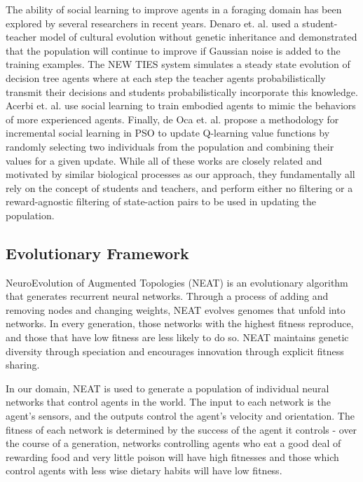 \documentclass{acm_proc_article-sp}
\begin{document}
The ability of social learning to improve agents in a foraging domain has been explored by several researchers in recent years. Denaro et. al. \cite{denaro1996cultural} used a student-teacher model of cultural evolution without genetic inheritance and demonstrated that the population will continue to improve if Gaussian noise is added to the training examples. The NEW TIES system \cite{haasdijk2008social, vogt2010modeling} simulates a steady state evolution of decision tree agents where at each step the teacher agents probabilistically transmit their decisions and students probabilistically incorporate this knowledge. Acerbi et. al. \cite{acerbi2007social} use social learning to train embodied agents to mimic the behaviors of more experienced agents. Finally, de Oca et. al. \cite{de2011incremental} propose a methodology for incremental social learning in PSO to update Q-learning \cite{watkins1992q} value functions by randomly selecting two individuals from the population and combining their values for a given update. While all of these works are closely related and motivated by similar biological processes as our approach, they fundamentally all rely on the concept of students and teachers, and perform either no filtering or a reward-agnostic filtering of state-action pairs to be used in updating the population.

\subsection*{Evolutionary Framework}
NeuroEvolution of Augmented Topologies (NEAT)\cite{stanley2002evolving} is an evolutionary algorithm that generates recurrent neural networks. Through a process of adding and removing nodes and changing weights, NEAT evolves genomes that unfold into networks. In every generation, those networks with the highest fitness reproduce, and those that have low fitness are less likely to do so. NEAT maintains genetic diversity through speciation and encourages innovation through explicit fitness sharing.

In our domain, NEAT is used to generate a population of individual neural networks that control agents in the world. The input to each network is the agent's sensors, and the outputs control the agent's velocity and orientation. The fitness of each network is determined by the success of the agent it controls - over the course of a generation, networks controlling agents who eat a good deal of rewarding food and very little poison will have high fitnesses and those which control agents with less wise dietary habits will have low fitness.
\end{document}
